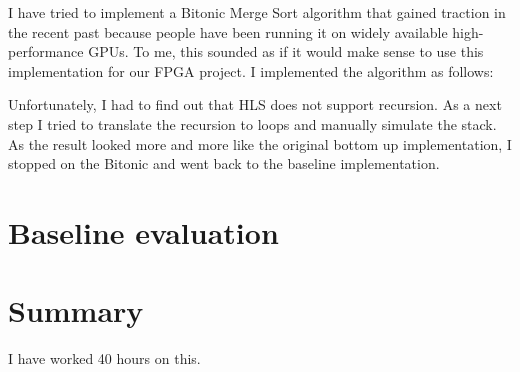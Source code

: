 \documentclass[11pt]{report}
\begin{document}
I have tried to implement a Bitonic Merge Sort algorithm that gained traction in the recent past because people have been running it on widely available high-performance GPUs. To me, this sounded as if it would make sense to use this implementation for our FPGA project. I implemented the algorithm as follows:



Unfortunately, I had to find out that HLS does not support recursion. As a next step I tried to translate the recursion to loops and manually simulate the stack. As the result looked more and more like the original bottom up implementation, I stopped on the Bitonic and went back to the baseline implementation.

\section{Baseline evaluation}

\section{Summary}

I have worked 40 hours on this.
\end{document}
